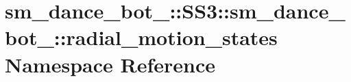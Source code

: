 \hypertarget{namespacesm__dance__bot__3_1_1SS3_1_1sm__dance__bot__3_1_1radial__motion__states}{}\section{sm\+\_\+dance\+\_\+bot\+\_\+:\+:S\+S3\+:\+:sm\+\_\+dance\+\_\+bot\+\_\+:\+:radial\+\_\+motion\+\_\+states Namespace Reference}
\label{namespacesm__dance__bot__3_1_1SS3_1_1sm__dance__bot__3_1_1radial__motion__states}
